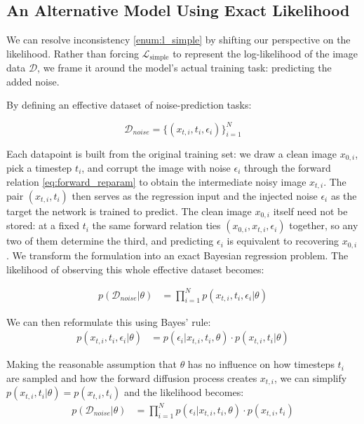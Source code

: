 
\subsection{An Alternative Model Using Exact Likelihood}

We can resolve inconsistency \ref{enum:l_simple} by shifting our perspective on the likelihood. Rather than forcing $\mathcal{L}_{\mathrm{simple}}$ to represent the log-likelihood of the image data $\mathcal{D}$, we frame it around the model's actual training task: predicting the added noise.

By defining an effective dataset of noise-prediction tasks:

\begin{equation}
\mathcal{D}_{noise} = \{(x_{t,i}, t_i, \epsilon_i)\}_{i=1}^N
\end{equation}

Each datapoint is built from the original training set: we draw a clean image $x_{0,i}$, pick a timestep $t_i$, and corrupt the image with noise $\epsilon_i$ through the forward relation \eqref{eq:forward_reparam} to obtain the intermediate noisy image $x_{t,i}$. The pair $(x_{t,i}, t_i)$ then serves as the regression input and the injected noise $\epsilon_i$ as the target the network is trained to predict. The clean image $x_{0,i}$ itself need not be stored: at a fixed $t_i$ the same forward relation ties $(x_{0,i}, x_{t,i}, \epsilon_i)$ together, so any two of them determine the third, and predicting $\epsilon_i$ is equivalent to recovering $x_{0,i}$. We transform the formulation into an exact Bayesian regression problem. The likelihood of observing this whole effective dataset becomes:

\begin{align}
    p(\mathcal{D}_{noise} | \theta) &= \prod_{i=1}^N p(x_{t,i}, t_i, \epsilon_i | \theta)
\end{align}

We can then reformulate this using Bayes' rule:
\begin{align}
    p(x_{t,i}, t_i, \epsilon_i | \theta) &= p(\epsilon_i | x_{t,i}, t_i, \theta) \cdot p(x_{t,i}, t_i | \theta)
\end{align}

Making the reasonable assumption that $\theta$ has no influence on how timesteps $t_i$ are sampled and how the forward diffusion process creates $x_{t,i}$, we can simplify $p(x_{t,i}, t_i | \theta) = p(x_{t,i}, t_i)$ and the likelihood becomes:
\begin{align}
    p(\mathcal{D}_{noise} | \theta) &= \prod_{i=1}^N p(\epsilon_i | x_{t,i}, t_i, \theta) \cdot p(x_{t,i}, t_i)
\end{align}

